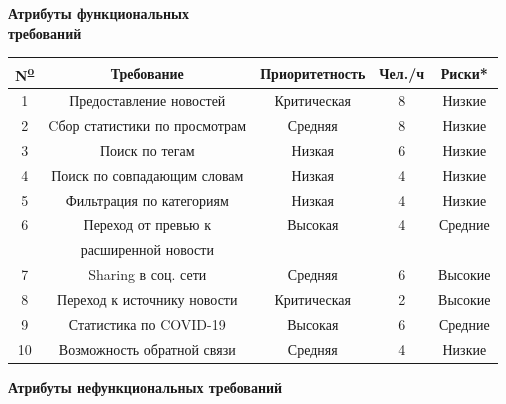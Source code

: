 \begin{center}
    \large
    \textbf{Атрибуты функциональных \\ требований\\}
    \small
    \begin{tabular}{|c|c|c|c|c|}
        \hline
        N\textsuperscript{\underline{o}} & Требование                    & Приоритетность & Чел./ч & Риски*  \\
        \hline
        1                                & Предоставление новостей       & Критическая    & 8      & Низкие  \\
        \hline
        2                                & Cбор статистики по просмотрам & Средняя        & 8      & Низкие  \\
        \hline
        3                                & Поиск по тегам                & Низкая         & 6      & Низкие  \\
        \hline
        4                                & Поиск по совпадающим словам   & Низкая         & 4      & Низкие  \\
        \hline
        5                                & Фильтрация по категориям      & Низкая         & 4      & Низкие  \\
        \hline
        6                                & Переход от превью к           & Высокая        & 4      & Средние \\
        & расширенной новости           &                &        &         \\
        \hline
        7                                & Sharing в соц. сети           & Средняя        & 6      & Высокие \\
        \hline
        8                                & Переход к источнику новости   & Критическая    & 2      & Высокие \\
        \hline
        9                                & Статистика по COVID-19        & Высокая        & 6      & Средние \\
        \hline
        10                               & Возможность обратной связи    & Средняя        & 4      & Низкие  \\
        \hline
    \end{tabular}
\end{center}
\large
\begin{center}
    \textbf{Атрибуты нефункциональных требований\\}
\end{center}

